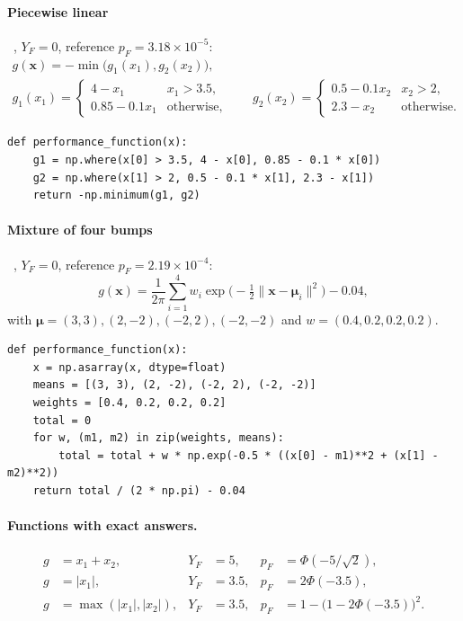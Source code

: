 \documentclass[11pt,a4paper]{article}
\theoremstyle{definition}
\theoremstyle{remark}
\newcommand{\x}{\mathbf{x}}
\begin{document}
\paragraph{Piecewise linear}~\cite{kinnear}, $Y_F = 0$, reference $p_F = 3.18\times10^{-5}$:
\begin{gather}
g(\x) = -\min\big(g_1(x_1), g_2(x_2)\big), \\
g_1(x_1) = \begin{cases} 4 - x_1 & x_1 > 3.5, \\ 0.85 - 0.1x_1 & \text{otherwise}, \end{cases} \qquad
g_2(x_2) = \begin{cases} 0.5 - 0.1x_2 & x_2 > 2, \\ 2.3 - x_2 & \text{otherwise}. \end{cases}
\end{gather}
\begin{lstlisting}
def performance_function(x):
    g1 = np.where(x[0] > 3.5, 4 - x[0], 0.85 - 0.1 * x[0])
    g2 = np.where(x[1] > 2, 0.5 - 0.1 * x[1], 2.3 - x[1])
    return -np.minimum(g1, g2)
\end{lstlisting}

\paragraph{Mixture of four bumps}~\cite{kinnear}, $Y_F = 0$, reference $p_F = 2.19\times10^{-4}$:
\begin{equation}
g(\x) = \frac{1}{2\pi}\sum_{i=1}^{4} w_i \exp\!\Big(-\tfrac12\|\x - \bm{\mu}_i\|^2\Big) - 0.04,
\end{equation}
with $\bm{\mu} = (3,3), (2,-2), (-2,2), (-2,-2)$ and $w = (0.4, 0.2, 0.2, 0.2)$.
\begin{lstlisting}
def performance_function(x):
    x = np.asarray(x, dtype=float)
    means = [(3, 3), (2, -2), (-2, 2), (-2, -2)]
    weights = [0.4, 0.2, 0.2, 0.2]
    total = 0
    for w, (m1, m2) in zip(weights, means):
        total = total + w * np.exp(-0.5 * ((x[0] - m1)**2 + (x[1] - m2)**2))
    return total / (2 * np.pi) - 0.04
\end{lstlisting}

\paragraph{Functions with exact answers.}
\begin{equation}
\begin{aligned}
g &= x_1 + x_2,                       & Y_F &= 5,   & p_F &= \Phi(-5/\sqrt2), \\
g &= |x_1|,                            & Y_F &= 3.5, & p_F &= 2\Phi(-3.5), \\
g &= \max(|x_1|, |x_2|),               & Y_F &= 3.5, & p_F &= 1 - \big(1 - 2\Phi(-3.5)\big)^2 .
\end{aligned}
\end{equation}
\end{document}
